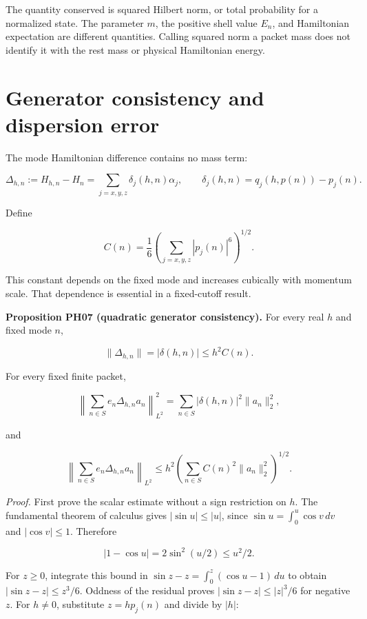The quantity conserved is squared Hilbert norm, or total probability for
a normalized state. The parameter \(m\), the positive shell value
\(E_n\), and Hamiltonian expectation are different quantities. Calling
squared norm a packet mass does not identify it with the rest mass or
physical Hamiltonian energy.

\hypertarget{generator-consistency-and-dispersion-error}{%
\section{Generator consistency and dispersion
error}\label{generator-consistency-and-dispersion-error}}

The mode Hamiltonian difference contains no mass term:

\[
\Delta_{h,n}:=H_{h,n}-H_n
=\sum_{j=x,y,z}\delta_j(h,n)\alpha_j,
\qquad
\delta_j(h,n)=q_j(h,p(n))-p_j(n).
\]

Define

\[
C(n)=\frac16\left(\sum_{j=x,y,z}|p_j(n)|^6\right)^{1/2}.
\]

This constant depends on the fixed mode and increases cubically with
momentum scale. That dependence is essential in a fixed-cutoff result.

\textbf{Proposition PH07 (quadratic generator consistency).} For every
real \(h\) and fixed mode \(n\),

\[
\|\Delta_{h,n}\|=|\delta(h,n)|\le h^2C(n).
\]

For every fixed finite packet,

\[
\left\|\sum_{n\in S}e_n\Delta_{h,n}a_n\right\|_{L^2}^2
=\sum_{n\in S}|\delta(h,n)|^2\|a_n\|_2^2,
\]

and

\[
\left\|\sum_{n\in S}e_n\Delta_{h,n}a_n\right\|_{L^2}
\le h^2\left(\sum_{n\in S}C(n)^2\|a_n\|_2^2\right)^{1/2}.
\]

\emph{Proof.} First prove the scalar estimate without a sign
restriction on \(h\). The fundamental theorem of calculus gives
\(|\sin u|\le|u|\), since \(\sin u=\int_0^u\cos v\,dv\) and
\(|\cos v|\le1\). Therefore

\[
|1-\cos u|=2\sin^2(u/2)\le u^2/2.
\]

For \(z\ge0\), integrate this bound in
\(\sin z-z=\int_0^z(\cos u-1)\,du\) to obtain \(|\sin z-z|\le z^3/6\).
Oddness of the residual proves \(|\sin z-z|\le|z|^3/6\) for negative
\(z\). For \(h\ne0\), substitute \(z=hp_j(n)\) and divide by \(|h|\):

